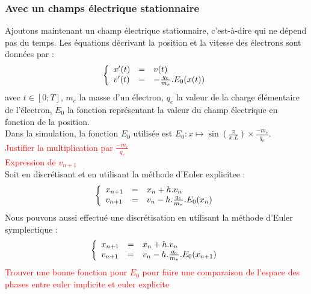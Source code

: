 \documentclass{article}
\begin{document}
\subsubsection*{Avec un champs électrique stationnaire}
Ajoutons maintenant un champ électrique stationnaire, c'est-à-dire qui ne dépend pas du temps. Les équations décrivant la position et la vitesse des électrons sont données par :
$$
\left \{
   \begin{array}{l l l}
      x'(t)  & = & v(t) \\
      v'(t)  & = & -\frac{q_e}{m_e}.E_0(x(t)) \\
	\end{array}
\right.
$$
avec $t \in [0;T]$, $m_e$ la masse d'un électron, $q_e$ la valeur de la charge élémentaire de l'électron, $E_0$ la fonction représentant la valeur du champ électrique en fonction de la position.\\
Dans la simulation, la fonction $E_0$ utilisée est $E_0 : x \mapsto \sin(\frac{\pi}{x.L}) \times \frac{-m_e}{q_e}$.\\
\textcolor{red}{Justifier la multiplication par $\frac{-m_e}{q_e}$}\\
\textcolor{red}{Expression de $v_{n+1}$}\\
Soit en discrétisant et en utilisant la méthode d'Euler explicitee :
$$
\left \{
   \begin{array}{l l l}
      x_{n+1}  & = & x_n + h.v_n \\
      v_{n+1}  & = & v_n - h.\frac{q_e}{m_e}.E_0(x_n) \\
	\end{array}
\right.
$$
Nous pouvons aussi effectué une discrétisation en utilisant la méthode d'Euler symplectique :
$$
\left \{
   \begin{array}{l l l}
      x_{n+1}  & = & x_n + h.v_n \\
      v_{n+1}  & = & v_n - h.\frac{q_e}{m_e}.E_0(x_{n+1}) \\
	\end{array}
\right.
$$
\textcolor{red}{Trouver une bonne fonction pour $E_0$ pour faire une comparaison de l'espace des phases entre euler implicite et euler explicite}\\
\end{document}
